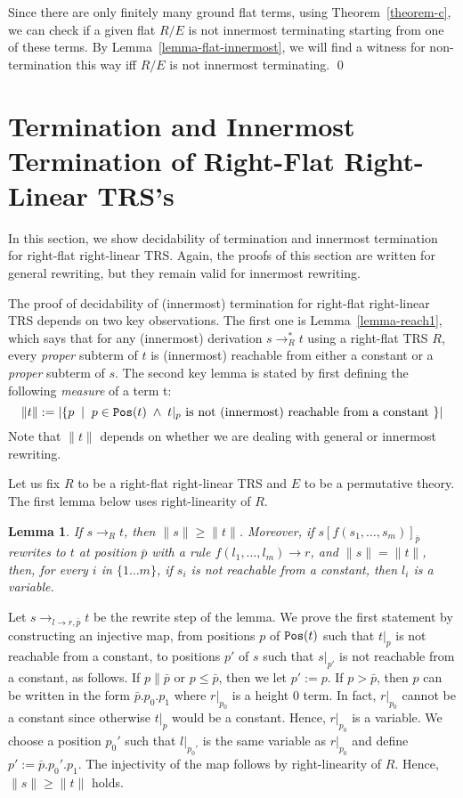 \documentclass{LMCS}
\theoremstyle{plain}
\newtheorem{lemma}[thm]{Lemma}
\begin{document}
Since there are only finitely many ground
flat terms, using Theorem~\ref{theorem-c}, we can check
if a given flat $R/E$ is not innermost terminating starting from
one of these terms. By Lemma~\ref{lemma-flat-innermost},
we will find a witness for non-termination this way
iff $R/E$ is not innermost terminating.
\qed



\section{Termination and Innermost Termination of Right-Flat Right-Linear TRS's}
\label{sec-right-flat-linear}

\noindent In this section, we show decidability of termination and
innermost termination for right-flat right-linear TRS.
Again, the proofs of this section are written for
general rewriting, but they remain valid for
innermost rewriting.

The proof of decidability of (innermost) termination for
right-flat right-linear TRS depends on two key
observations. The first one is Lemma~\ref{lemma-reach1},
which says that for any (innermost) derivation 
$s\rightarrow_R^* t$ using a right-flat TRS $R$,
every {\em proper} subterm of
$t$ is (innermost) reachable from either a constant or a 
{\em proper} subterm of $s$.
The second key lemma is stated by first
defining the following {\em measure} of a term t: 
$$
\|t\|:=|\{p\;\mid\;p\in{\tt Pos}(t)\;\wedge\;t|_p\mbox{ is not (innermost) reachable from a constant }\}|
$$
Note that $\|t\|$ depends on
whether we are dealing with general or innermost rewriting.

Let us fix $R$ to be a right-flat right-linear TRS and
$E$ to be a permutative theory.
The first lemma below uses right-linearity of $R$.

\begin{lemma}\label{decreasing}
If $s\to_R t$, then $\|s\|\geq\|t\|$.
Moreover, if $s[f(s_1,\ldots,s_m)]_{\bar{p}}$ rewrites to $t$
at position $\bar{p}$ with a rule $f(l_1,\ldots,l_m)\rightarrow r$,
and $\|s\|=\|t\|$, then, for every $i$ in $\{1\ldots m\}$,
if $s_i$ is not reachable from a constant, then
$l_i$ is a variable.
\end{lemma}
\proof
Let $s\rightarrow_{l\rightarrow r,\bar{p}} t$ be the rewrite
step of the lemma.
We prove the first statement by constructing
an injective map, from positions $p$ of ${\tt Pos}(t)$
such that $t|_{p}$ is not reachable from a constant, to
positions $p'$ of $s$ such that $s|_{p'}$ is not reachable
from a constant, as follows. If $p\parallel \bar{p}$ or $p\leq \bar{p}$,
then we let $p':=p$. If $p>\bar{p}$, then $p$ can be written
in the form $\bar{p}.p_0.p_1$ where $r|_{p_0}$ is a height $0$ term.
In fact, $r|_{p_0}$ cannot be a constant since otherwise
$t|_{p}$ would be a constant. Hence, $r|_{p_0}$ is a variable.
We choose a position $p_0'$ such that $l|_{p_0'}$ is the
same variable as $r|_{p_0}$ and define $p' :=\bar{p}.p_0'.p_1$. The injectivity
of the map follows by right-linearity of $R$. Hence,
$\|s\| \geq \|t\|$ holds.
\end{document}
